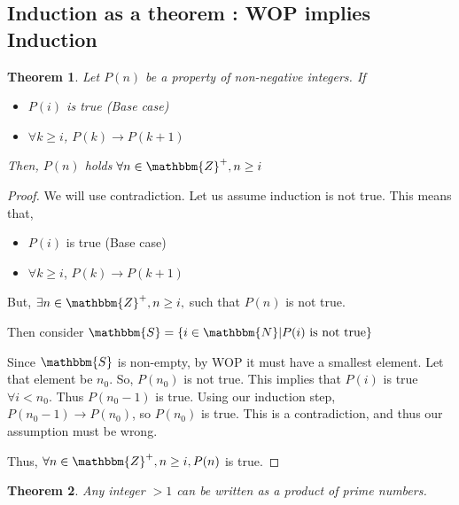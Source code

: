 \documentclass[14pt]{extarticle}
\newcommand{\impl}{\xrightarrow{}}
\newcommand{\N}{\mathbbm{N}}
\newcommand{\Z}{\mathbbm{Z}}
\newcommand{\Sset}{\mathbbm{S}}
\newtheorem{theorem}{Theorem}
\begin{document}
\subsection{Induction as a theorem : WOP implies Induction}

\begin{theorem}
    Let $P(n)$ be a property of non-negative integers. If
    \begin{itemize}
        \item $P(i)$ is true (Base case)
        \item $\forall k\geq i$, $P(k) \impl P(k+1)$
    \end{itemize}
    Then, $P(n)$ holds $\forall n\in \Z^+, n\geq i$
\end{theorem}

\begin{proof}
    We will use contradiction. Let us assume induction is not true. This means that,

    \begin{itemize}
        \item $P(i)$ is true (Base case)
        \item $\forall k\geq i$, $P(k) \impl P(k+1)$
    \end{itemize}

    But, $\exists n\in \Z^+, n\geq i,$ such that $P(n)$ is not true.

    Then consider $\Sset = \{ i\in\N | P(i) \text{ is not true}  \}$

    Since $\Sset$ is non-empty, by WOP it must have a smallest element. Let that element be $n_0$. So, $P(n_0)$ is not true. This implies that $P(i)$ is true $\forall i<n_0$. Thus $P(n_0-1)$ is true. Using our induction step, $P(n_0-1) \impl P(n_0)$, so $P(n_0)$ is true. This is a contradiction, and thus our assumption must be wrong.

    Thus, $\forall n\in \Z^+, n\geq i, P(n)$ is true.
\end{proof}

\begin{theorem}
    Any integer $> 1$ can be written as a product of prime numbers.
\end{theorem}
\end{document}

